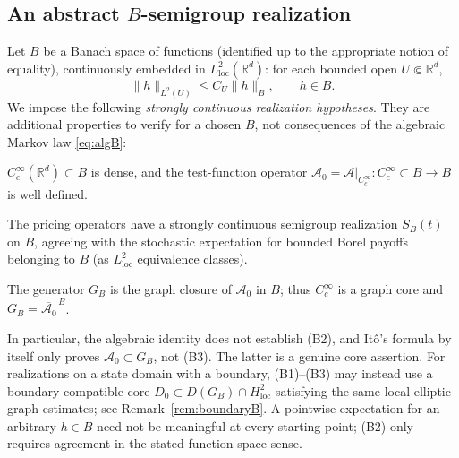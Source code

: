 \documentclass[11pt,a4paper]{article}
\theoremstyle{definition}\newtheorem{definition}{Definition}[section]\newtheorem{example}[theorem]{Example}
\theoremstyle{remark}\newtheorem{remark}[theorem]{Remark}\newtheorem{remarkSix}{Remark}[section]
\newcommand{\Rd}{\mathbb R^d}
\newcommand{\Cc}{C_c^\infty}
\newcommand{\loc}{\mathrm{loc}}
\newcommand{\norm}[1]{\lVert #1\rVert}
\newcommand{\cA}{\mathcal A}
\begin{document}
\subsection{An abstract \texorpdfstring{$B$}{B}-semigroup realization}
\label{subsec:abstractB}
Let $B$ be a Banach space of functions (identified up to the appropriate notion of equality), continuously embedded in $L^2_{\loc}(\Rd)$: for each bounded open $U\Subset\Rd$,
\begin{equation}\label{eq:embeddingB}
 \norm{h}_{L^2(U)}\le C_U\norm h_B,\qquad h\in B.
\end{equation}
We impose the following \emph{strongly continuous realization hypotheses}. They are additional properties to verify for a chosen $B$, not consequences of the algebraic Markov law \eqref{eq:algB}:
\begin{description}[font=\normalfont\bfseries,leftmargin=12mm,labelwidth=10mm,itemsep=4pt]
\item[(B1)] $\Cc(\Rd)\subset B$ is dense, and the test-function operator $\cA_0=\cA|_{\Cc}:\Cc\subset B\to B$ is well defined.
\item[(B2)] The pricing operators have a strongly continuous semigroup realization $S_B(t)$ on $B$, agreeing with the stochastic expectation for bounded Borel payoffs belonging to $B$ (as $L^2_{\loc}$ equivalence classes).
\item[(B3)] The generator $G_B$ is the graph closure of $\cA_0$ in $B$; thus $\Cc$ is a graph core and $G_B=\overline{\cA_0}^{\,B}$.
\end{description}
In particular, the algebraic identity does not establish (B2), and It\^o's formula by itself only proves $\cA_0\subset G_B$, not (B3). The latter is a genuine core assertion. For realizations on a state domain with a boundary, (B1)--(B3) may instead use a boundary-compatible core $D_0\subset D(G_B)\cap H^2_{\loc}$ satisfying the same local elliptic graph estimates; see Remark~\ref{rem:boundaryB}. A pointwise expectation for an arbitrary $h\in B$ need not be meaningful at every starting point; (B2) only requires agreement in the stated function-space sense.
\end{document}
